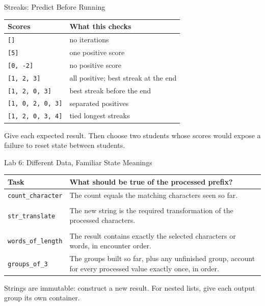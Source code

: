 \documentclass[aspectratio=169,10pt]{beamer}
\begin{document}
\begin{frame}{Streaks: Predict Before Running}
\small
\begin{center}
\begin{tabular}{ll}
\textbf{Scores} & \textbf{What this checks}\\\hline
\texttt{[]} & no iterations\\
\texttt{[5]} & one positive score\\
\texttt{[0, -2]} & no positive score\\
\texttt{[1, 2, 3]} & all positive; best streak at the end\\
\texttt{[1, 2, 0, 3]} & best streak before the end\\
\texttt{[1, 0, 2, 0, 3]} & separated positives\\
\texttt{[1, 2, 0, 3, 4]} & tied longest streaks
\end{tabular}
\end{center}
\begin{activity}Give each expected result. Then choose two students whose scores would expose a failure to reset state between students.\end{activity}
\end{frame}


\begin{frame}{Lab 6: Different Data, Familiar State Meanings}
\small
\begin{center}
\begin{tabular}{@{}lp{.65\linewidth}@{}}
\textbf{Task} & \textbf{What should be true of the processed prefix?}\\\hline
\texttt{count\_character} & The count equals the matching characters seen so far.\\[5pt]
\shortstack[l]{\texttt{swap\_case},\\\texttt{str\_translate}} & The new string is the required transformation of the processed characters.\\[5pt]
\shortstack[l]{\texttt{remove\_character},\\\texttt{words\_of\_length}} & The result contains exactly the selected characters or words, in encounter order.\\[5pt]
\texttt{groups\_of\_3} & The groups built so far, plus any unfinished group, account for every processed value exactly once, in order.
\end{tabular}
\end{center}
\begin{keyidea}Strings are immutable: construct a new result. For nested lists, give each output group its own container.\end{keyidea}
\end{frame}
\end{document}
